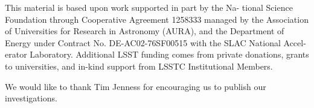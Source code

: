\documentclass[11pt,twoside]{article}
\begin{document}
\acknowledgements This material is based upon work supported in part by the Na- tional Science Foundation through Cooperative Agreement 1258333 managed by the Association of Universities for Research in Astronomy (AURA), and the Department of Energy under Contract No. DE-AC02-76SF00515 with the SLAC National Accel- erator Laboratory. Additional LSST funding comes from private donations, grants to universities, and in-kind support from LSSTC Institutional Members.

We would like to thank Tim Jenness for encouraging us to publish our investigations.

\end{document}
